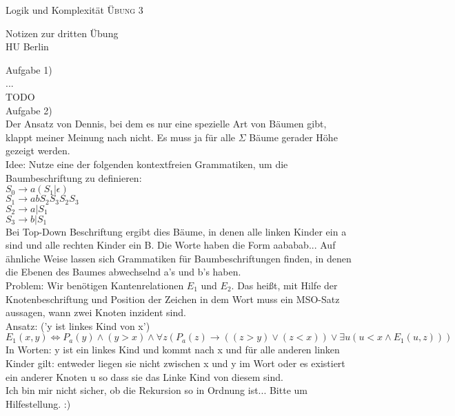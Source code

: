 \documentclass[12pt]{article}
\begin{document}
\begin{center}
\Large
Logik und Komplexität  \textsc{ Übung 3 }
\end{center}

\begin{flushright}
Notizen zur dritten Übung\\
HU Berlin \\

\vspace{2 mm}

\end{flushright}

Aufgabe 1)\\
...\\
TODO\\

Aufgabe 2)\\
Der Ansatz von Dennis, bei dem es nur eine spezielle Art von Bäumen gibt, klappt meiner Meinung nach nicht. Es muss ja für alle $\Sigma$ Bäume gerader Höhe gezeigt werden.\\
Idee: Nutze eine der folgenden kontextfreien Grammatiken, um die Baumbeschriftung zu definieren:\\
$S_0 \rightarrow a(S_1 | \epsilon)$\\
$S_1 \rightarrow ab S_2 S_3 S_2 S_3$\\
$S_2 \rightarrow a | S_1 $\\
$S_3 \rightarrow b | S_1 $\\
Bei Top-Down Beschriftung ergibt dies Bäume, in denen alle linken Kinder ein a sind und alle rechten Kinder ein B. Die Worte haben die Form aababab... Auf ähnliche Weise lassen sich Grammatiken für Baumbeschriftungen finden, in denen die Ebenen des Baumes abwechselnd a's und b's haben.\\
Problem: Wir benötigen Kantenrelationen $E_1$ und $E_2$. Das heißt, mit Hilfe der Knotenbeschriftung und Position der Zeichen in dem Wort muss ein MSO-Satz aussagen, wann zwei Knoten inzident sind.\\
Ansatz: ('y ist linkes Kind von x')\\
$ E_1(x,y) \iff P_a(y) \land (y>x) \land \forall z ( P_a(z) \rightarrow ( (z>y) \lor (z<x) ) \lor \exists u (u<x \land E_1(u,z))) $\\
In Worten: y ist ein linkes Kind und kommt nach x und für alle anderen linken Kinder gilt: entweder liegen sie nicht zwischen x und y im Wort oder es existiert ein anderer Knoten u so dass sie das Linke Kind von diesem sind.\\
Ich bin mir nicht sicher, ob die Rekursion so in Ordnung ist... Bitte um Hilfestellung. :)\\
\end{document}
